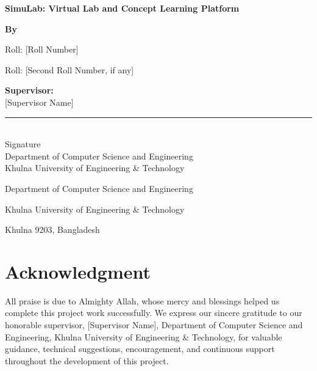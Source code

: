 \documentclass[12pt,a4paper]{report}
\begin{document}
\setcounter{page}{1}
\begin{titlepage}
\centering
\vspace*{0.35in}
{\bfseries\fontsize{16}{20}\selectfont SimuLab: Virtual Lab and Concept Learning Platform\par}
\vspace{0.55in}
{\bfseries\fontsize{12}{16}\selectfont By\par}
\vspace{0.3in}
{\fontsize{12}{16}\par}
{\fontsize{12}{16}\selectfont Roll: [Roll Number]\par}
\vspace{0.15in}
{\fontsize{12}{16}\par}
{\fontsize{12}{16}\selectfont Roll: [Second Roll Number, if any]\par}
\vspace{0.65in}
\begin{flushleft}
\textbf{Supervisor:}\\[6pt]
[Supervisor Name] \hfill \rule{1.7in}{0.4pt}\\
[Supervisor Designation] \hfill Signature\\
Department of Computer Science and Engineering\\
Khulna University of Engineering \& Technology
\end{flushleft}
\vfill
{\fontsize{12}{16}\selectfont Department of Computer Science and Engineering\par}
{\fontsize{12}{16}\selectfont Khulna University of Engineering \& Technology\par}
{\fontsize{12}{16}\selectfont Khulna 9203, Bangladesh\par}
{\fontsize{12}{16}\par}
\end{titlepage}

\chapter*{Acknowledgment}
All praise is due to Almighty Allah, whose mercy and blessings helped us complete this project work successfully. We express our sincere gratitude to our honorable supervisor, [Supervisor Name], Department of Computer Science and Engineering, Khulna University of Engineering \& Technology, for valuable guidance, technical suggestions, encouragement, and continuous support throughout the development of this project.
\end{document}
